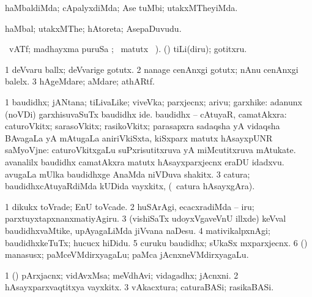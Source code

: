 {{{{{{\bentry
{} 
\gl{\kirxvi}
\expl{}
\bmng
haMbaldiMda; cApalyxdiMda; Ase tuMbi; utakxMTheyiMda. 
\emng
\eentry

\bentry
{} 
\gl{\nA}
\expl{}
\bmng
haMbal; utakxMThe; hAtoreta; AsepaDuvudu. 
\emng
\eentry

\bentry
{} 
\gl{\kirx}
  \ucAcx\ vATf; madhayxma puruSa ; \BU\ matutx \BUkaq\ ). \bmng
(\pArxparx) tiLi(diru); gotitxru. 
\emng

\noindent
\gl{\pagu}
\expl{}
\bmng
\bnum
\num{1}  deVvaru ballx; deVvarige gotutx. 
\num{2}  nanage cenAnxgi gotutx; nAnu cenAnxgi balelx. 
\num{3}  hAgeMdare; aMdare; athARtf. 
\enum
\emng
\eentry

\bentry
{} 
\gl{\nA}
\expl{}
\bmng
\bnum
\num{1} baudidhx; jANtana; tiLivaLike; viveVka; parxjecnx; arivu; garxhike:  adanunx (noVDi) garxhisuvaSuTx baudidhx ide. 
 baudidhx -- cAtuyaR, camatAkxra: 
\banum
{} caturoVkitx; sarasoVkitx; rasikoVkitx; parasapxra sadaqsha yA vidaqsha BAvagaLa yA mAtugaLa aniriVkiSxta, kiSxparx matutx hAsayxpUNR saMyoVjne:  caturoVkitxgaLu suPxrisutitxruva yA miMcutitxruva mAtukate.  avanalilx baudidhx camatAkxra matutx hAsayxparxjecnx eraDU idadxvu. 
 avugaLa mUlka baudidhxge AnaMda niVDuva shakitx. 
\eanum
\numie
\num{3} catura; baudidhxcAtuyaRdiMda kUDida vayxkitx, (\kanmu\ catura hAsayxgAra). 
\enum
\emng

\noindent
\gl{\pagu}
\expl{}
\bmng
\bnum
\num{1}  dikukx toVrade; EnU toVcade. 
\num{2}  huSArAgi, ecacxradiMda -- iru; parxtuyxtapxnanxmatiyAgiru. 
\num{3}  (vishiSaTx udoyxVgaveVnU illxde) keVval baudidhxvaMtike, upAyagaLiMda jiVvana naDesu. 
\num{4}  mativikalpxnAgi; baudidhxkeTuTx; hucucx hiDidu. 
\num{5}  curuku baudidhx; sUkaSx mxparxjecnx. 
\num{6}  (\pArxparx) manasusx; paMceVMdirxyagaLu; paMca jAcnxneVMdirxyagaLu. 
\enum
\emng
\eentry

\bentry
{} 
\gl{\nA}
\expl{}
\bmng
\bnum
\num{1} (\pArxparx) pArxjacnx; vidAvxMsa; meVdhAvi; vidagadhx; jAcnxni. 
\num{2} hAsayxparxvaqtitxya vayxkitx. 
\num{3} vAkacxtura; caturaBASi; rasikaBASi. 
\enum
\emng
\eentry

}}}}}}
